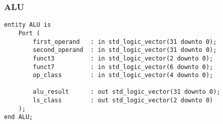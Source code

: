 \subsubsection{ALU}
\begin{code}
\label{code:IE_ALU}  
\begin{verbatim}
entity ALU is
    Port (
        first_operand   : in std_logic_vector(31 downto 0);
        second_operand  : in std_logic_vector(31 downto 0);
        funct3          : in std_logic_vector(2 downto 0);
        funct7          : in std_logic_vector(6 downto 0);
        op_class        : in std_logic_vector(4 downto 0);
        
        alu_result      : out std_logic_vector(31 downto 0);
        ls_class        : out std_logic_vector(2 downto 0)
    );
end ALU;


\end{verbatim}
\end{code}
